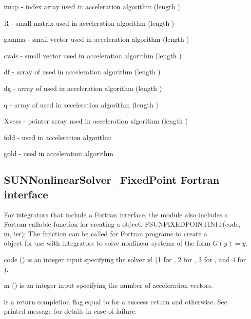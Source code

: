 \begin{args}[Xvecs]
  \item[imap]  - index array used in acceleration algorithm (length )
  \item[R]     - small matrix used in acceleration algorithm (length )
  \item[gamma] - small vector used in acceleration algorithm (length )
  \item[cvals] - small vector used in acceleration algorithm (length )
  \item[df]    - array of  used in acceleration algorithm (length )
  \item[dg]    - array of  used in acceleration algorithm (length )
  \item[q]     - array of  used in acceleration algorithm (length )
  \item[Xvecs] -  pointer array used in acceleration algorithm (length )
  \item[fold]  -  used in acceleration algorithm
  \item[gold]  -  used in acceleration algorithm
\end{args}


\subsection{SUNNonlinearSolver\_FixedPoint Fortran interface}
\label{ss:sunnonlinsolfixedpoint_fortran}

For {\sundials} integrators that include a Fortran interface, the
{\sunnonlinsolfixedpoint} module also includes a Fortran-callable
function for creating a  object.
{
  FSUNFIXEDPOINTINIT(code, m, ier);
}
{
  The function  can be called for Fortran programs
  to create a\\
   object for use with {\sundials}
  integrators to solve nonlinear systems of the form $G(y) = y$.
}
{
  \begin{args}[code]
  \item[code] ()
    is an integer input specifying the solver id (1 for {\cvode}, 2
    for {\ida}, 3 for {\kinsol}, and 4 for {\arkode}).
  \item[m] ()
    is an integer input specifying the number of acceleration vectors.
  \end{args}
}
{
   is a return completion flag equal to  for a success
  return and  otherwise. See printed message for details in case
  of failure.
}
{}
